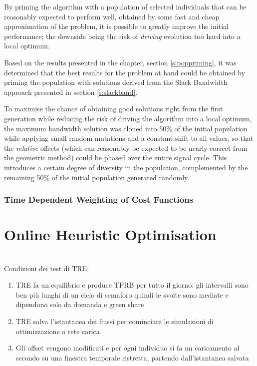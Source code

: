 By priming the algorithm with a population of selected individuals that can be reasonably expected to perform well, obtained by some fast and cheap approximation of the problem, it is possible to greatly improve the initial performance; the downside being the risk of \emph{driving} evolution too hard into a local optimum.

Based on the results presented in the  chapter, section \ref{s:poppriming}, it was determined that the best results for the problem at hand could be obtained by priming the population with solutions derived from the Slack Bandwidth approach presented in section \ref{s:slackband}.

To maximise the chance of obtaining good solutions right from the first generation while reducing the risk of driving the algorithm into a local optimum, the maximum bandwidth solution was cloned into 50\% of the initial population while applying small random mutations and a constant shift to all values, so that the \emph{relative} offsets (which can reasonably be expected to be nearly correct from the geometric method) could be phased over the entire signal cycle. This introduces a certain degree of diversity in the population, complemented by the remaining 50\% of the initial population generated randomly.

\subsubsection*{Time Dependent Weighting of Cost Functions}


\section{Online Heuristic Optimisation}
\\
Condizioni dei test di TRE:
\begin{enumerate}
\item TRE fa un equilibrio e produce TPRB per tutto il giorno: gli intervalli sono ben più lunghi di un ciclo di semaforo quindi le svolte sono mediate e dipendono solo da domanda e green share
\item TRE salva l'istantanea dei flussi per cominciare le simulazioni di ottimizzazione a rete carica
\item Gli offset vengono modificati e per ogni individuo si fa un caricamento al secondo su una finestra temporale ristretta, partendo dall'istantanea salvata
\end{enumerate}

